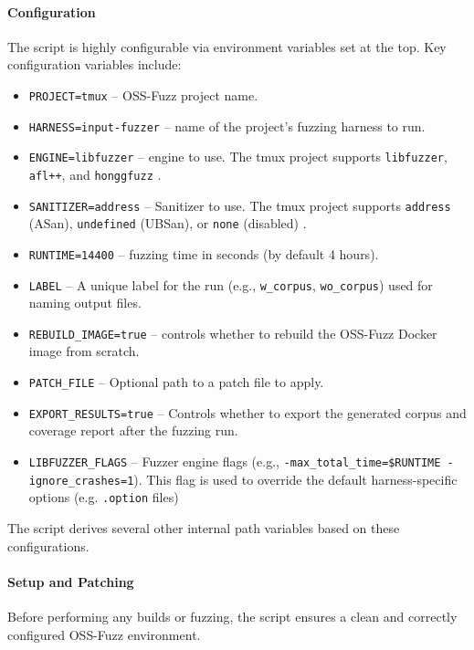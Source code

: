 \documentclass[11pt,a4paper,twocolumn]{article}
\begin{document}
\noindent \paragraph{Configuration} \label{sec:methodology_configuration} The script is highly configurable via environment variables set at the top. Key configuration variables include:
\begin{itemize}
	\item \texttt{PROJECT=tmux} -- OSS-Fuzz project name.
	\item \texttt{HARNESS=input-fuzzer} -- name of the project's fuzzing harness to run.
	\item \texttt{ENGINE=libfuzzer} -- engine to use. The tmux project supports \texttt{libfuzzer}, \texttt{afl++}, and \texttt{honggfuzz} \cite{oss-fuzz:tmux_project_yaml}.
	\item \texttt{SANITIZER=address} -- Sanitizer to use. The tmux project supports \texttt{address} (ASan), \texttt{undefined} (UBSan), or \texttt{none} (disabled) \cite{oss-fuzz:tmux_project_yaml}.
	\item \texttt{RUNTIME=14400} -- fuzzing time in seconds (by default 4 hours).
	\item \texttt{LABEL} -- A unique label for the run (e.g., \texttt{w\_corpus}, \texttt{wo\_corpus}) used for naming output files.
	\item \texttt{REBUILD\_IMAGE=true} -- controls whether to rebuild the OSS-Fuzz Docker image from scratch.
	\item \texttt{PATCH\_FILE} -- Optional path to a patch file to apply.
	\item \texttt{EXPORT\_RESULTS=true} -- Controls whether to export the generated corpus and coverage report after the fuzzing run.
	\item \texttt{LIBFUZZER\_FLAGS} -- Fuzzer engine flags (e.g., \texttt{-max\_total\_time=\$RUNTIME -ignore\_crashes=1}). This flag is used to override the default harness-specific options (e.g. \texttt{.option} files)
\end{itemize}

The script derives several other internal path variables based on these configurations.

\noindent \paragraph{Setup and Patching} \label{sec:methodology_setup_patching}

Before performing any builds or fuzzing, the script ensures a clean and correctly configured OSS-Fuzz environment.
\end{document}
